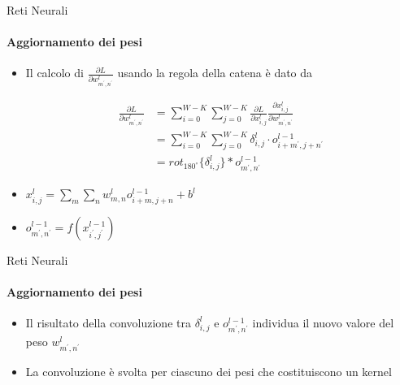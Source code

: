 \documentclass[
 ]{beamer}
\begin{document}
\begin{frame}{Reti Neurali}
    \framesubtitle{Aggiornamento dei pesi}
     \smallskip
     \begin{itemize} [<+->]
     \setlength\itemsep{1em}
     \item \large Il calcolo di $\frac{\partial L}{\partial w_{m^{\prime}, n^{\prime}}^l}$ usando la regola della catena è dato da
     
    \begin{equation*}
        \begin{split}
            \frac{\partial L}{\partial w_{m^{\prime}, n^{\prime}}^l} & = \sum_{i=0}^{W-K} \sum_{j=0}^{W-K} \frac{\partial L}{\partial x_{i,j}^{l}} \frac{\partial x_{i,j}^{l}}{\partial w_{m^{\prime},n^{\prime}}^l} \\[10pt]
           & = \sum_{i = 0}^{W - K}\sum_{j = 0}^{W - K} \delta_{i,j}^l \cdot o_{i + m^{\prime},j + n^{\prime}}^{l-1} \\[10pt]            
           & = rot_{180^\circ} \{ \delta_{i,j}^l \} * o_{m^{\prime},n^{\prime}}^{l-1} 
        \end{split}          
    \end{equation*} 
    
    \bigskip
    
    \item \large $x_{i,j}^l = \sum_{m} \sum_{n} w_{m,n}^{l}o_{i+m, j+n}^{l-1} + b^l$         
    \item \large $o_{m^{\prime},n^{\prime}}^{l-1} = f(x_{i^{\prime},j^{\prime}}^{l-1})$    
    \end{itemize}     
\end{frame}

\begin{frame}{Reti Neurali}
    \framesubtitle{Aggiornamento dei pesi}
    
    \bigskip
    
     \begin{itemize} [<+->]
     \setlength\itemsep{3em}
    \item \large Il risultato della convoluzione tra $\delta_{i,j}^l$ e $o_{m^{\prime},n^{\prime}}^{l-1}$ individua il nuovo valore del peso $w_{m^{\prime}, n^{\prime}}^l$
    \item \large La convoluzione è svolta per ciascuno dei pesi che costituiscono un kernel     
    \end{itemize}     
\end{frame}
\end{document}
